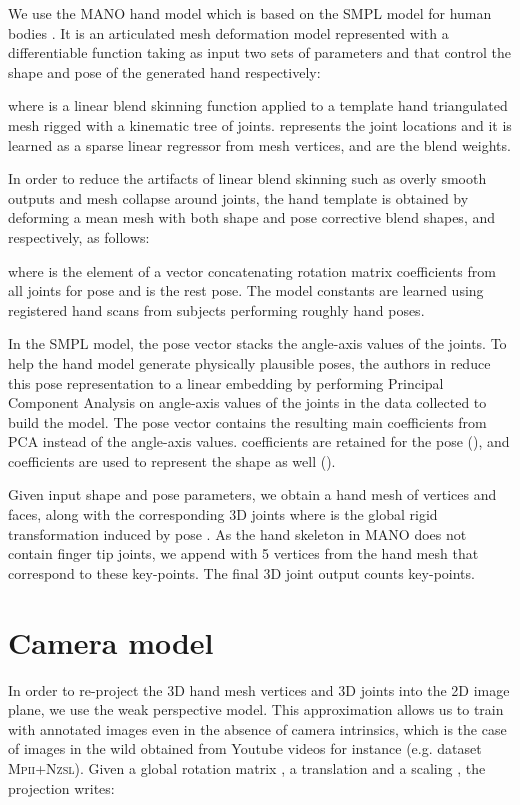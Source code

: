 \documentclass[10pt,twocolumn,letterpaper]{article}
\begin{document}
We use the MANO hand model \cite{romero2017embodied} which is based on the SMPL model for human bodies \cite{SMPL:2015}. It is an articulated mesh deformation model represented with a differentiable function  taking as input two sets of parameters  and   that control the shape and pose of the generated hand respectively:   

where  is a linear blend skinning \cite{Kavan:2005:SBS:1053427.1053429} function applied to a template hand triangulated mesh  rigged with a kinematic tree of  joints.  represents the joint locations and it is learned as a sparse linear regressor from mesh vertices, and  are the blend weights.

In order to reduce the artifacts of linear blend skinning such as overly smooth outputs and mesh collapse around joints, the hand template  is obtained by deforming a mean mesh  with both shape and pose corrective blend shapes,  and  respectively, as follows: 

where  is the  element of a vector concatenating rotation matrix coefficients from all joints for pose  and  is the rest pose. The model constants  are learned using registered hand scans from  subjects performing roughly  hand poses. 

In the SMPL model, the pose vector  stacks the angle-axis values of the joints. To help the hand model generate physically plausible poses, the authors in \cite{romero2017embodied} reduce this pose representation to a linear embedding by performing Principal Component Analysis on angle-axis values of the joints in the data collected to build the model. The pose vector  contains the resulting main coefficients from PCA instead of the angle-axis values.  coefficients are retained for the pose (), and  coefficients are used to represent the shape as well ().

Given input shape and pose parameters, we obtain a hand mesh  of  vertices and  faces, along with the corresponding 3D joints  where  is the global rigid transformation induced by pose . As the hand skeleton in MANO does not contain finger tip joints, we append  with 5 vertices from the hand mesh that correspond to these key-points. The final 3D joint output  counts  key-points.



\section{Camera model}

In order to re-project the 3D hand mesh vertices  and 3D joints  into the 2D image plane, we use the weak perspective model. This approximation allows us to train with annotated images even in the absence of camera intrinsics, which is the case of images in the wild obtained from Youtube videos for instance (e.g. dataset \textsc{Mpii+Nzsl}). Given a global rotation matrix , a translation  and a scaling , the projection writes:    
\end{document}
